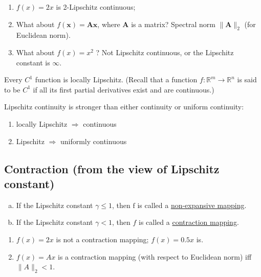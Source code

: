\documentclass[11pt]{elegantbook}
\begin{document}
\begin{example}[ (Lipschitz)]
    \begin{enumerate}
        \item $f(x)=2 x$ is 2-Lipschitz continuous;
        \item What about $f(\mathbf{x})=\mathbf{A x}$, where $\mathbf{A}$ is a matrix? Spectral norm $\|\mathbf{A}\|_{2}$ (for Euclidean norm).
        \item What about $f(x)=x^{2}$ ?
        Not Lipschitz continuous, or the Lipschitz constant is $\infty$.
    \end{enumerate}
\end{example}
\begin{example}
    Every $C^1$ function is locally Lipschitz. (Recall that a function $f : \mathbb{R}^m \rightarrow \mathbb{R}^n$ is said to be $C^1$ if all its first partial derivatives exist and are continuous.)
\end{example}
\begin{claim}
    Lipschitz continuity is stronger than either continuity or uniform continuity:
    \begin{enumerate}[$\circ$]
        \item locally Lipschitz $\Rightarrow$ continuous
        \item Lipschitz $\Rightarrow$ uniformly continuous
    \end{enumerate}
\end{claim}

\subsection{Contraction (from the view of Lipschitz constant)}
\begin{enumerate}[a).]
    \item If the Lipschitz constant $\gamma \leq 1$, then $\mathrm{f}$ is called a \underline{non-expansive mapping}.
    \item If the Lipschitz constant  $\gamma<1$, then $f$ is called a \underline{contraction mapping}.
\end{enumerate}

\begin{example}
    \begin{enumerate}
        \item $f(x)=2 x$ is not a contraction mapping; $f(x)=0.5 x$ is.
        \item $f(x)=A x$ is a contraction mapping (with respect to Euclidean norm) iff $\|A\|_{2}<1$.
    \end{enumerate}
\end{example}
\end{document}
